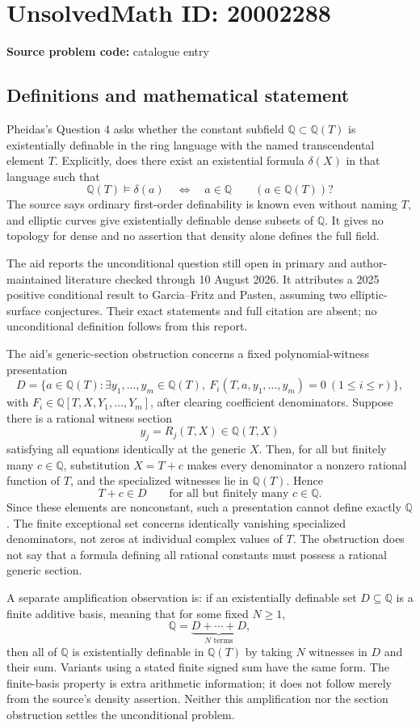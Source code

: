 \documentclass[11pt]{article}
\newcommand{\Q}{\mathbb{Q}}
\begin{document}
\section*{UnsolvedMath ID: 20002288}
\textbf{Source problem code:} catalogue entry
\subsection{Definitions and mathematical statement}
Pheidas's Question \(4\) asks whether the constant subfield \(\Q\subset\Q(T)\) is existentially definable in the ring language with the named transcendental element \(T\). Explicitly, does there exist an existential formula \(\delta(X)\) in that language such that
\[
 \Q(T)\models\delta(a)\quad\Longleftrightarrow\quad a\in\Q
 \qquad(a\in\Q(T))?
\]
The source says ordinary first-order definability is known even without naming \(T\), and elliptic curves give existentially definable dense subsets of \(\Q\). It gives no topology for dense and no assertion that density alone defines the full field.

The aid reports the unconditional question still open in primary and author-maintained literature checked through 10 August 2026. It attributes a 2025 positive conditional result to Garcia--Fritz and Pasten, assuming two elliptic-surface conjectures. Their exact statements and full citation are absent; no unconditional definition follows from this report.

The aid's generic-section obstruction concerns a fixed polynomial-witness presentation
\[
 D=\{a\in\Q(T):\exists y_1,\ldots,y_m\in\Q(T),\
       F_i(T,a,y_1,\ldots,y_m)=0\ (1\leq i\leq r)\},
\]
with \(F_i\in\Q[T,X,Y_1,\ldots,Y_m]\), after clearing coefficient denominators. Suppose there is a rational witness section
\[
 y_j=R_j(T,X)\in\Q(T,X)
\]
satisfying all equations identically at the generic \(X\). Then, for all but finitely many \(c\in\Q\), substitution \(X=T+c\) makes every denominator a nonzero rational function of \(T\), and the specialized witnesses lie in \(\Q(T)\). Hence
\[
 T+c\in D\qquad\text{for all but finitely many }c\in\Q.
\]
Since these elements are nonconstant, such a presentation cannot define exactly \(\Q\). The finite exceptional set concerns identically vanishing specialized denominators, not zeros at individual complex values of \(T\). The obstruction does not say that a formula defining all rational constants must possess a rational generic section.

A separate amplification observation is: if an existentially definable set \(D\subseteq\Q\) is a finite additive basis, meaning that for some fixed \(N\geq1\),
\[
 \Q=\underbrace{D+\cdots+D}_{N\text{ terms}},
\]
then all of \(\Q\) is existentially definable in \(\Q(T)\) by taking \(N\) witnesses in \(D\) and their sum. Variants using a stated finite signed sum have the same form. The finite-basis property is extra arithmetic information; it does not follow merely from the source's density assertion. Neither this amplification nor the section obstruction settles the unconditional problem.
\end{document}
